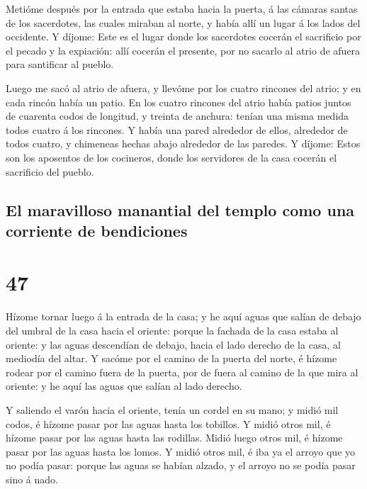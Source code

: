  Metióme después por la entrada que estaba hacia la
puerta, á las cámaras santas de los sacerdotes, las cuales miraban al
norte, y había allí un lugar á los lados del occidente. 
Y díjome: Este es el lugar donde los sacerdotes cocerán el sacrificio
por el pecado y la expiación: allí cocerán el presente, por no sacarlo
al atrio de afuera para santificar al pueblo.

 Luego me sacó al atrio de afuera, y llevóme por los
cuatro rincones del atrio; y en cada rincón había un patio.
 En los cuatro rincones del atrio había patios juntos de
cuarenta codos de longitud, y treinta de anchura: tenían una misma
medida todos cuatro á los rincones.  Y había una pared
alrededor de ellos, alrededor de todos cuatro, y chimeneas hechas abajo
alrededor de las paredes.  Y díjome: Estos son los
aposentos de los cocineros, donde los servidores de la casa cocerán el
sacrificio del pueblo.

\hypertarget{el-maravilloso-manantial-del-templo-como-una-corriente-de-bendiciones}{%
\subsection{El maravilloso manantial del templo como una corriente de
bendiciones}\label{el-maravilloso-manantial-del-templo-como-una-corriente-de-bendiciones}}

\hypertarget{section-26-47}{%
\section{47}\label{section-26-47}}

 Hízome tornar luego á la entrada de la casa; y he aquí
aguas que salían de debajo del umbral de la casa hacia el oriente:
porque la fachada de la casa estaba al oriente: y las aguas descendían
de debajo, hacia el lado derecho de la casa, al mediodía del altar.
 Y sacóme por el camino de la puerta del norte, é hízome
rodear por el camino fuera de la puerta, por de fuera al camino de la
que mira al oriente: y he aquí las aguas que salían al lado derecho.

 Y saliendo el varón hacia el oriente, tenía un cordel en
su mano; y midió mil codos, é hízome pasar por las aguas hasta los
tobillos.  Y midió otros mil, é hízome pasar por las aguas
hasta las rodillas. Midió luego otros mil, é hízome pasar por las aguas
hasta los lomos.  Y midió otros mil, é iba ya el arroyo
que yo no podía pasar: porque las aguas se habían alzado, y el arroyo no
se podía pasar sino á nado.

